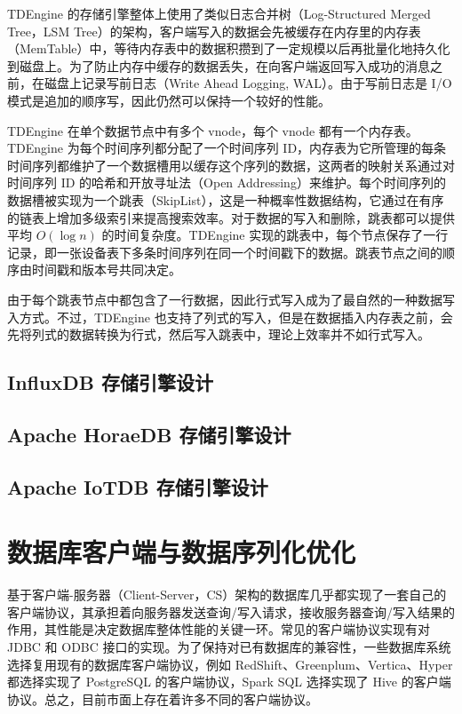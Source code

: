TDEngine 的存储引擎整体上使用了类似日志合并树（Log-Structured Merged Tree，LSM Tree）\cite{o1996log}的架构，客户端写入的数据会先被缓存在内存里的内存表（MemTable）中，等待内存表中的数据积攒到了一定规模以后再批量化地持久化到磁盘上。为了防止内存中缓存的数据丢失，在向客户端返回写入成功的消息之前，在磁盘上记录写前日志（Write Ahead Logging, WAL）\cite{mohan1992aries}。由于写前日志是 I/O 模式是追加的顺序写，因此仍然可以保持一个较好的性能。

TDEngine 在单个数据节点中有多个 vnode，每个 vnode 都有一个内存表。TDEngine 为每个时间序列都分配了一个时间序列 ID，内存表为它所管理的每条时间序列都维护了一个数据槽用以缓存这个序列的数据，这两者的映射关系通过对时间序列 ID 的哈希和开放寻址法（Open Addressing）来维护。每个时间序列的数据槽被实现为一个跳表（SkipList）\cite{pugh1990skip}，这是一种概率性数据结构，它通过在有序的链表上增加多级索引来提高搜索效率。对于数据的写入和删除，跳表都可以提供平均 $O(\log n)$ 的时间复杂度。TDEngine 实现的跳表中，每个节点保存了一行记录，即一张设备表下多条时间序列在同一个时间戳下的数据。跳表节点之间的顺序由时间戳和版本号共同决定。

由于每个跳表节点中都包含了一行数据，因此行式写入成为了最自然的一种数据写入方式。不过，TDEngine 也支持了列式的写入，但是在数据插入内存表之前，会先将列式的数据转换为行式，然后写入跳表中，理论上效率并不如行式写入。
\subsection{InfluxDB 存储引擎设计}
\subsection{Apache HoraeDB 存储引擎设计}
\subsection{Apache IoTDB 存储引擎设计}
\section{数据库客户端与数据序列化优化}
基于客户端-服务器（Client-Server，CS）架构的数据库几乎都实现了一套自己的客户端协议，其承担着向服务器发送查询/写入请求，接收服务器查询/写入结果的作用，其性能是决定数据库整体性能的关键一环。常见的客户端协议实现有对 JDBC\cite{zukowski2006jdbc} 和 ODBC\cite{geiger1995inside} 接口的实现。为了保持对已有数据库的兼容性，一些数据库系统选择复用现有的数据库客户端协议，例如 RedShift\cite{gupta2015amazon}、Greenplum\cite{lyu2021greenplum}、Vertica\cite{lamb2012vertica}、Hyper\cite{neumann2011efficiently} 都选择实现了 PostgreSQL 的客户端协议，Spark SQL\cite{armbrust2015spark} 选择实现了 Hive 的客户端协议。总之，目前市面上存在着许多不同的客户端协议。

